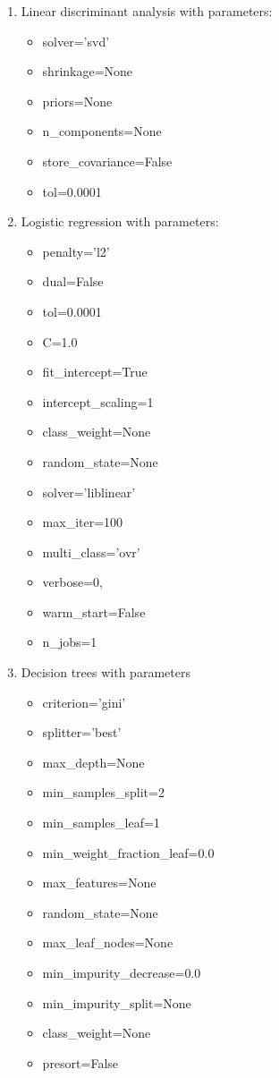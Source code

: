 \documentclass{article} %
\begin{document}
  \begin{enumerate}   
    \item Linear discriminant analysis with parameters:
       \begin{itemize}
           \item solver=’svd’ 
            \item shrinkage=None 
            \item priors=None 
            \item n\_components=None 
            \item store\_covariance=False 
           \item tol=0.0001
       \end{itemize}

    \item Logistic regression with parameters:
       \begin{itemize}
           \item penalty=’l2’
           \item dual=False
           \item tol=0.0001
           \item  C=1.0
           \item fit\_intercept=True
           \item intercept\_scaling=1
           \item class\_weight=None
           \item random\_state=None
          \item  solver=’liblinear’
          \item  max\_iter=100
          \item  multi\_class=’ovr’
          \item verbose=0, 
          \item warm\_start=False 
          \item  n\_jobs=1
       \end{itemize}
    \item Decision trees with parameters
      \begin{itemize}
           \item criterion=’gini’
           \item splitter=’best’ 
           \item max\_depth=None 
           \item min\_samples\_split=2
           \item min\_samples\_leaf=1 
           \item min\_weight\_fraction\_leaf=0.0 
           \item max\_features=None 
           \item random\_state=None 
           \item max\_leaf\_nodes=None 
          \item min\_impurity\_decrease=0.0 
          \item min\_impurity\_split=None 
          \item class\_weight=None 
          \item presort=False
       \end{itemize}
   \end{enumerate}
\end{document}
